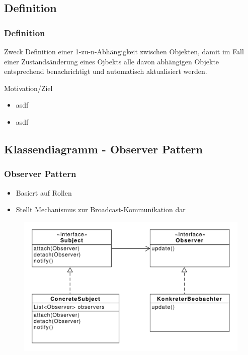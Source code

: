 \subsection{Definition}
\begin{frame}
  \frametitle{Definition}

  \begin{block}{Zweck}
  	Definition einer 1-zu-n-Abhängigkeit zwischen Objekten, damit im Fall einer Zustandsänderung eines Ojbekts alle davon abhängigen Objekte entsprechend benachrichtigt und automatisch aktualisiert werden.
  \end{block}
  	
  \begin{block}{Motivation/Ziel}
  	\begin{itemize}
  		\item asdf
  		\item asdf
  	\end{itemize}
  \end{block}
\end{frame}

\subsection{Klassendiagramm - Observer Pattern}
\begin{frame}
	\frametitle{Observer Pattern}
	\begin{itemize}
		\item Basiert auf Rollen
		\item Stellt Mechanismus zur Broadcast-Kommunikation dar
	\end{itemize}	
	
  	\begin{figure}
		\includegraphics[scale=.4]{paper/observer/observer}
	\end{figure}
\end{frame}


